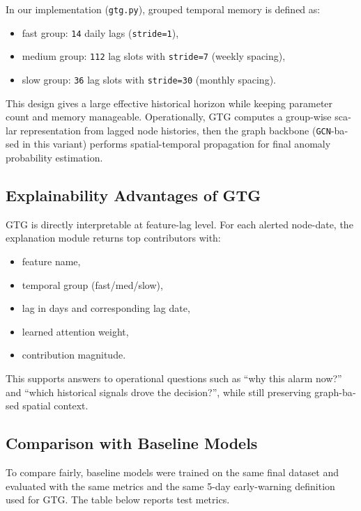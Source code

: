 \documentclass[12pt,a4paper]{article}
\begin{document}
\begin{latin}
In our implementation (\texttt{gtg.py}), grouped temporal memory is defined as:
\begin{itemize}
\item fast group: \texttt{14} daily lags (\texttt{stride=1}),
\item medium group: \texttt{112} lag slots with \texttt{stride=7} (weekly spacing),
\item slow group: \texttt{36} lag slots with \texttt{stride=30} (monthly spacing).
\end{itemize}

This design gives a large effective historical horizon while keeping parameter count and memory manageable.
Operationally, GTG computes a group-wise scalar representation from lagged node histories, then the graph backbone (\texttt{GCN}-based in this variant) performs spatial-temporal propagation for final anomaly probability estimation.

\subsection{Explainability Advantages of GTG}
GTG is directly interpretable at feature-lag level.
For each alerted node-date, the explanation module returns top contributors with:
\begin{itemize}
\item feature name,
\item temporal group (fast/med/slow),
\item lag in days and corresponding lag date,
\item learned attention weight,
\item contribution magnitude.
\end{itemize}

This supports answers to operational questions such as ``why this alarm now?'' and ``which historical signals drove the decision?'', while still preserving graph-based spatial context.

\subsection{Comparison with Baseline Models}
To compare fairly, baseline models were trained on the same final dataset and evaluated with the same metrics and the same 5-day early-warning definition used for GTG.
The table below reports test metrics.


\end{latin}
\end{document}

